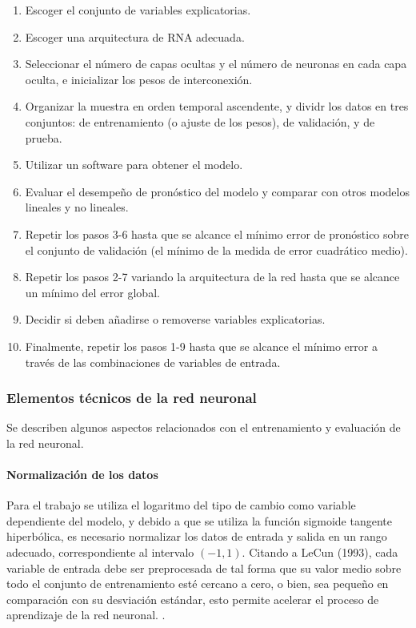 \begin{enumerate}
	\item Escoger el conjunto de variables explicatorias.

	\item Escoger una arquitectura de RNA adecuada.
	
	\item Seleccionar el número de capas ocultas y el número de neuronas en cada capa oculta, e inicializar los pesos de interconexión.
	
	\item Organizar la muestra en orden temporal ascendente, y dividr los datos en tres conjuntos: de entrenamiento (o ajuste de los pesos), de validación, y de prueba.
	
	\item Utilizar un software para obtener el modelo.
	
	\item Evaluar el desempeño de pronóstico del modelo y comparar con otros modelos lineales y no lineales.
	
	\item Repetir los pasos 3-6 hasta que se alcance el mínimo error de pronóstico sobre el conjunto de validación (el mínimo de la medida de error cuadrático medio).
	
	\item Repetir los pasos 2-7 variando la arquitectura de la red hasta que se alcance un mínimo del error global.
	
	\item Decidir si deben añadirse o removerse variables explicatorias.
	
	\item Finalmente, repetir los pasos 1-9 hasta que se alcance el mínimo error a través de las combinaciones de variables de entrada.
\end{enumerate}


\subsubsection{Elementos técnicos de la red neuronal}
Se describen algunos aspectos relacionados con el entrenamiento y evaluación de la red neuronal.

\paragraph{Normalización de los datos} Para el trabajo se utiliza el logaritmo del tipo de cambio como variable dependiente del modelo, y debido a que se utiliza la función sigmoide tangente hiperbólica, es necesario normalizar los datos de entrada y salida en un rango adecuado, correspondiente al intervalo $(-1, 1)$. Citando a LeCun (1993), cada variable de entrada debe ser preprocesada de tal forma que su valor medio sobre todo el conjunto de entrenamiento esté cercano a cero, o bien, sea pequeño en comparación con su desviación estándar, esto permite acelerar el proceso de aprendizaje de la red neuronal. \parencite{haykin1999neural}.\\

